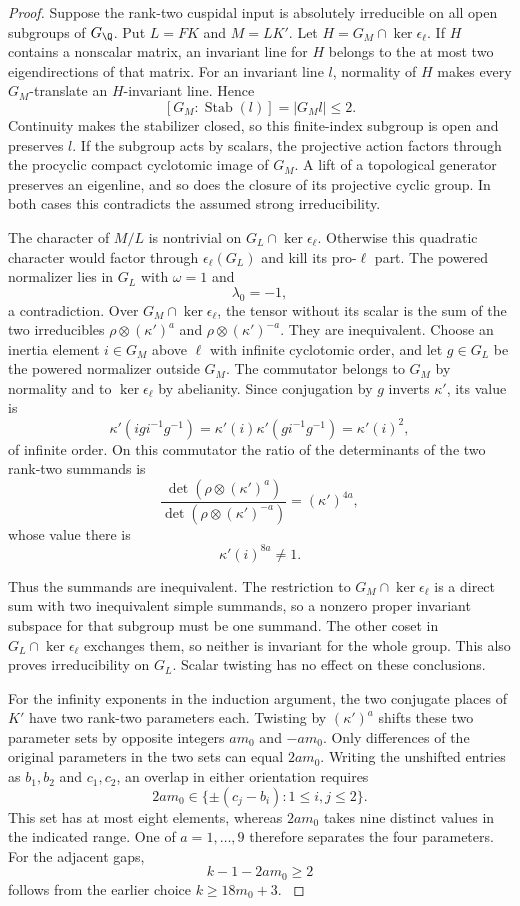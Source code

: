 \begin{proof}
Suppose the rank-two cuspidal input is absolutely
irreducible on all open subgroups of \(G_{\Q}\).
Put \(L=FK\) and \(M=LK'\).
Let \(H=G_M\cap\ker\epsilon_\ell\). If \(H\) contains a
nonscalar matrix, an invariant line for \(H\) belongs to the
at most two eigendirections of that matrix. For an invariant line \(l\), normality of \(H\) makes every \(G_M\)-translate an \(H\)-invariant line. Hence
\[
 [G_M:\operatorname{Stab}(l)]=|G_M l|\le2 .
\]
Continuity makes the stabilizer closed, so this finite-index subgroup is open and preserves \(l\).
If the subgroup acts by scalars, the projective
action factors through the procyclic compact
cyclotomic image of \(G_M\). A lift of a
topological generator preserves an eigenline,
and so does the closure of its projective cyclic
group. In both cases this contradicts the assumed
strong irreducibility.

The character of \(M/L\) is nontrivial on
\(G_L\cap\ker\epsilon_\ell\). Otherwise this quadratic
character would factor through \(\epsilon_\ell(G_L)\)
and kill its pro-\(\ell\) part. The powered normalizer
lies in \(G_L\) with \(\omega=1\) and
\[
 \lambda_0=-1,
\]
a contradiction.
Over \(G_M\cap\ker\epsilon_\ell\), the tensor without
its scalar is the sum of the two irreducibles
\(\rho\otimes(\kappa')^a\) and
\(\rho\otimes(\kappa')^{-a}\).
They are inequivalent. Choose an inertia element
\(i\in G_M\) above \(\ell\) with infinite cyclotomic
order, and let \(g\in G_L\) be the powered
normalizer outside \(G_M\). The commutator belongs to \(G_M\) by normality and to \(\ker\epsilon_\ell\) by abelianity. Since conjugation by \(g\) inverts \(\kappa'\), its value is
\[
 \kappa'(igi^{-1}g^{-1})
 =\kappa'(i)\kappa'(gi^{-1}g^{-1})
 =\kappa'(i)^2 ,
\]
of infinite order. On this commutator the ratio of the determinants of
the two rank-two summands is
\[
 \frac{\det(\rho\otimes(\kappa')^a)}
           {\det(\rho\otimes(\kappa')^{-a})}
       =(\kappa')^{4a},
\]
whose value there is
\[
 \kappa'(i)^{8a}\ne1.
\]

Thus the summands are inequivalent. The restriction to
\(G_M\cap\ker\epsilon_\ell\) is a direct sum with two
inequivalent simple summands, so a nonzero proper
invariant subspace for that subgroup must be one summand.
The other coset in \(G_L\cap\ker\epsilon_\ell\) exchanges
them, so neither is invariant for the whole group.
This also proves irreducibility on \(G_L\).
Scalar twisting has no effect on these conclusions.

For the infinity exponents in the induction
argument, the two conjugate places of \(K'\)
have two rank-two parameters each. Twisting
by \((\kappa')^a\) shifts these two parameter sets
by opposite integers \(am_0\) and \(-am_0\).
Only differences of the original parameters
in the two sets can equal \(2am_0\).
Writing the unshifted entries as \(b_1,b_2\) and \(c_1,c_2\), an overlap in either orientation requires
\[
  2am_0\in\{\pm(c_j-b_i):1\le i,j\le2\}.
\]
This set has at most eight elements, whereas \(2am_0\) takes nine distinct values in the indicated range. One of \(a=1,\ldots,9\)
therefore separates the four parameters. For the adjacent gaps,
\[
                       k-1-2am_0\ge2
\]
follows from the earlier choice \(k\ge18m_0+3\).
\label{cor:ordinary-count-iii-seed-3}

\end{proof}


